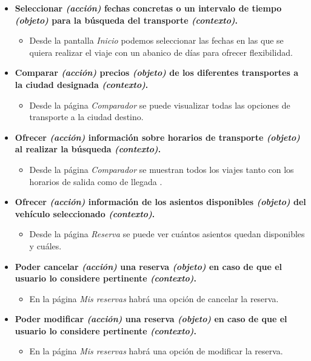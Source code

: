 \begin{itemize}
    \item \textbf{Seleccionar \textit{(acción)} fechas concretas o un intervalo de tiempo \textit{(objeto)} para la búsqueda del transporte \textit{(contexto)}.}
        \begin{itemize}
            \item Desde la pantalla \textit{Inicio} podemos seleccionar las fechas en las que se quiera realizar el viaje con un abanico de días para
                ofrecer flexibilidad.
        \end{itemize}
    
    \item \textbf{Comparar \textit{(acción)} precios \textit{(objeto)} de los diferentes transportes a la ciudad designada \textit{(contexto)}.}
        \begin{itemize}
            \item Desde la página \textit{Comparador} se puede visualizar todas las opciones de transporte a la ciudad destino.
        \end{itemize}

    \item \textbf{Ofrecer \textit{(acción)} información sobre horarios de transporte \textit{(objeto)} al realizar la búsqueda \textit{(contexto)}.}
        \begin{itemize}
            \item Desde la página \textit{Comparador} se muestran todos los viajes tanto con los horarios de salida como de llegada .
        \end{itemize}

    \item \textbf{Ofrecer \textit{(acción)} información de los asientos disponibles \textit{(objeto)} del vehículo seleccionado \textit{(contexto)}.}
        \begin{itemize}
            \item Desde la página \textit{Reserva} se puede ver cuántos asientos quedan disponibles y cuáles.
        \end{itemize}

    \item \textbf{Poder cancelar \textit{(acción)} una reserva \textit{(objeto)} en caso de que el usuario lo considere pertinente \textit{(contexto)}.}
        \begin{itemize}
            \item En la página \textit{Mis reservas} habrá una opción de cancelar la reserva.
        \end{itemize}

    \item \textbf{Poder modificar \textit{(acción)} una reserva \textit{(objeto)} en caso de que el usuario lo considere pertinente \textit{(contexto)}.}
        \begin{itemize}
            \item En la página \textit{Mis reservas} habrá una opción de modificar la reserva.
        \end{itemize}
\end{itemize}


